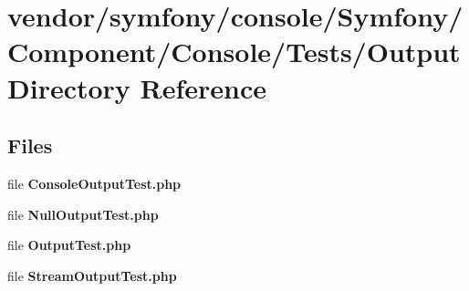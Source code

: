 \section{vendor/symfony/console/\+Symfony/\+Component/\+Console/\+Tests/\+Output Directory Reference}
\label{dir_a76f093e06f901487c76c368d92d71e4}
\subsection*{Files}
\begin{DoxyCompactItemize}
\item 
file {\bf Console\+Output\+Test.\+php}
\item 
file {\bf Null\+Output\+Test.\+php}
\item 
file {\bf Output\+Test.\+php}
\item 
file {\bf Stream\+Output\+Test.\+php}
\end{DoxyCompactItemize}
